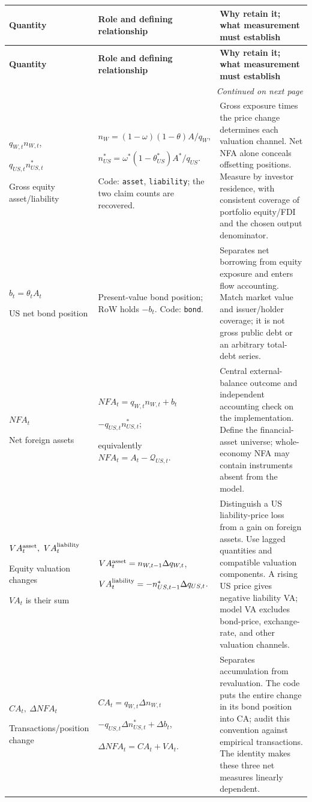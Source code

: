 \documentclass[10pt,a4paper,landscape]{article}
\makeatletter
\newcommand{\Q}{\mathcal Q}
\newcommand{\code}[1]{{\footnotesize\texttt{#1}}}
\newenvironment{coretable}{%
\begin{longtable}{@{}P{\dimexpr .19\textwidth-3.8pt\relax}P{\dimexpr .35\textwidth-7pt\relax}P{\dimexpr .46\textwidth-9.2pt\relax}@{}}
\toprule
\rowcolor{tablehead}\textbf{Quantity} & \textbf{Role and defining relationship} & \textbf{Why retain it; what measurement must establish}\\
\midrule
\endfirsthead
\toprule
\rowcolor{tablehead}\textbf{Quantity} & \textbf{Role and defining relationship} & \textbf{Why retain it; what measurement must establish}\\
\midrule
\endhead
\midrule\multicolumn{3}{r}{\footnotesize\itshape Continued on next page}\\
\endfoot
\bottomrule
\endlastfoot
}{\end{longtable}}
\makeatother
\begin{document}
\begin{coretable}
$q_{W,t}n_{W,t}$,\par$q_{US,t}n_{US,t}^*$\par Gross equity asset/liability & $n_W=(1-\omega)(1-\theta)A/q_W$,\par\vspace{3pt}
$n_{US}^*=\omega^*(1-\theta_{US}^*)A^*/q_{US}$.\par Code: \code{asset}, \code{liability}; the two claim counts are recovered. & Gross exposure times the price change determines each valuation channel. Net NFA alone conceals offsetting positions. Measure by investor residence, with consistent coverage of portfolio equity/FDI and the chosen output denominator.\\[6pt]
$b_t=\theta_t A_t$\par US net bond position & Present-value bond position; RoW holds $-b_t$. Code: \code{bond}. & Separates net borrowing from equity exposure and enters flow accounting. Match market value and issuer/holder coverage; it is not gross public debt or an arbitrary total-debt series.\\[6pt]
$NFA_t$\par Net foreign assets & $NFA_t=q_{W,t}n_{W,t}+b_t$\par\hfill$-q_{US,t}n_{US,t}^*$;\par\vspace{3pt}
equivalently $NFA_t=A_t-\Q_{US,t}$. & Central external-balance outcome and independent accounting check on the implementation. Define the financial-asset universe; whole-economy NFA may contain instruments absent from the model.\\[6pt]
$VA_t^{\rm asset},\ VA_t^{\rm liability}$\par Equity valuation changes\par$VA_t$ is their sum & $VA_t^{\rm asset}=n_{W,t-1}\Delta q_{W,t}$,\par\vspace{3pt}
$VA_t^{\rm liability}=-n_{US,t-1}^*\Delta q_{US,t}$. & Distinguish a US liability-price loss from a gain on foreign assets. Use lagged quantities and compatible valuation components. A rising US price gives negative liability VA; model VA excludes bond-price, exchange-rate, and other valuation channels.\\[6pt]
$CA_t,\ \Delta NFA_t$\par Transactions/position change & $CA_t=q_{W,t}\Delta n_{W,t}$\par\hfill$-q_{US,t}\Delta n_{US,t}^*+\Delta b_t$,\par\vspace{3pt}
$\Delta NFA_t=CA_t+VA_t$. & Separates accumulation from revaluation. The code puts the entire change in its bond position into CA; audit this convention against empirical transactions. The identity makes these three net measures linearly dependent.\\[6pt]
\end{coretable}
\end{document}
